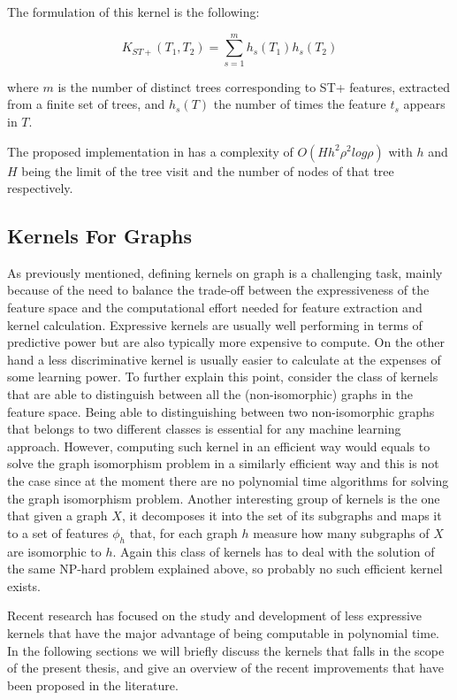 The formulation of this kernel is the following:

\begin{equation}
    K_{ST+}(T_1, T_2) = \sum_{s=1}^m h_s(T_1)h_s(T_2)
\end{equation}

where $m$ is the number of distinct trees corresponding to ST+ features, extracted
from a finite set of trees, and $h_s(T)$ the number of times the feature $t_s$
appears in $T$.

The proposed implementation in \cite{dasanmartino2015exploiting} has a complexity of
$O(Hh^2\rho^2log\rho)$ with $h$ and $H$ being the limit
of the tree visit and the number of nodes of that tree respectively.

\subsection{Kernels For Graphs}

As previously mentioned, defining kernels on graph is a challenging task, mainly
because of the need to balance the trade-off between the expressiveness of the
feature space and the computational effort needed for feature extraction and
kernel calculation.
Expressive kernels are usually well performing in terms of predictive power but
are also typically more expensive to compute.
On the other hand a less discriminative kernel is usually easier to calculate
at the expenses of some learning power.
To further explain this point, consider the class of kernels that are able to
distinguish between all the (non-isomorphic) graphs in the feature space.
Being able to distinguishing between two non-isomorphic graphs that belongs to two
different classes is essential for any machine learning approach.
However, computing such kernel in an efficient way would equals to solve the
graph isomorphism problem in a similarly efficient way and this is not the case
since at the moment there are no polynomial time algorithms for solving the graph isomorphism problem.
Another interesting group of kernels is the one that given a graph $X$, it decomposes
it into the set of its subgraphs and maps it to a set of features $\phi_h$ that, for
each graph $h$ measure how many subgraphs of $X$ are isomorphic to $h$.
Again this class of kernels has to deal with the solution of the same NP-hard
problem explained above, so probably no such efficient kernel exists.

Recent research has focused on the study and development of less expressive
kernels that have the major advantage of being computable in polynomial time.
In the following sections we will briefly discuss the kernels that falls in the
scope of the present thesis, and give an overview of the recent improvements that
have been proposed in the literature.

